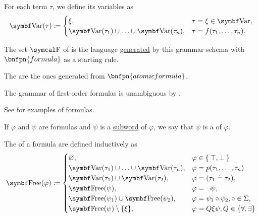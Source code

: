\begin{definition}
\begin{DefEnum}
     For each term \( \tau \), we define its variables as
    \begin{equation*}
      \Bold{Var}(\tau) \coloneqq \begin{cases}
        \xi,                                                    &\tau = \xi \in \Bold{Var},        \\
        \Bold{Var}(\tau_1) \cup \ldots \cup \Bold{Var}(\tau_n), &\tau = f(\tau_1, \ldots, \tau_n).
      \end{cases}
    \end{equation*}

     The set \( \CF \) of  is the language \hyperref[def:grammar_derivation/grammar_language]{generated} by this grammar schema with \( \bnfpn{formula} \) as a starting rule.

    The  are the ones generated from \( \bnfpn{atomic formula} \).

    The grammar of first-order formulas is unambiguous by .

    See  for examples of formulas.

     If \( \varphi \) and \( \psi \) are formulas and \( \psi \) is a \hyperref[def:language/subword]{subword} of \( \varphi \), we say that \( \psi \) is a  of \( \varphi \).

     The  of a formula are defined inductively as
    \begin{equation}\label{eq:def:first_order_language/formula_free_variables}
      \Bold{Free}(\varphi) \coloneqq \begin{cases}
        \varnothing,                                            &\varphi \in \Set{ \top, \bot } \\
        \Bold{Var}(\tau_1) \cup \ldots \cup \Bold{Var}(\tau_n), &\varphi = p(\tau_1, \ldots, \tau_n) \\
        \Bold{Var}(\tau_1) \cup \Bold{Var}(\tau_2),             &\varphi = (\tau_1 \doteq \tau_2), \\
        \Bold{Free}(\psi),                                      &\varphi = \neg \psi, \\
        \Bold{Free}(\psi_1) \cup \Bold{Free}(\psi_2),           &\varphi = \psi_1 \circ \psi_2, \circ \in \Sigma, \\
        \Bold{Free}(\psi) \setminus \{ \xi \},                  &\varphi = Q \xi \psi, Q \in \{ \forall, \exists \}
      \end{cases}
    \end{equation}


\end{DefEnum}
\end{definition}
